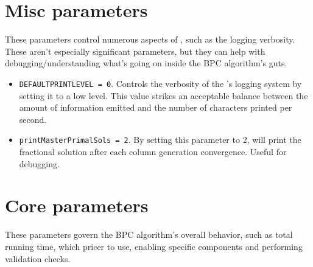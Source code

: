 \section{Misc parameters}

These parameters control numerous aspects of \bapcod{}, such as the logging verbosity.
These aren't especially significant parameters,
but they can help with debugging/understanding what's going on inside the BPC algorithm's guts.

\begin{itemize}
	\item \texttt{DEFAULTPRINTLEVEL = 0}.
	      Controls the verbosity of the \bapcod{}'s logging system by setting it to a low level.
	      This value strikes an acceptable balance between the amount
	      of information emitted and the number of characters printed per second.
	\item \texttt{printMasterPrimalSols = 2}.
	      By setting this parameter to 2, \bapcod{} will print the fractional solution after each column generation convergence.
	      Useful for debugging.
\end{itemize}

\section{Core parameters}

These parameters govern the BPC algorithm's overall behavior,
such as total running time, which pricer to use, enabling specific components
and performing validation checks.

